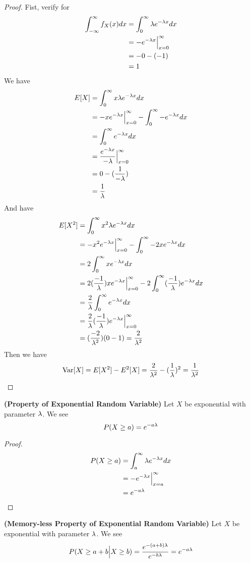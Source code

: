 \documentclass{report}
\begin{document}
\begin{proof}
Fist, verify for
\begin{align}
\int_{-\infty}^\infty f_X(x)dx&=\int_{0}^\infty \lambda e^{-\lambda x}dx\\
                              &=-e^{-\lambda x}\Big|_{x=0}^\infty\\
                              &=-0-(-1)\\
                              &=1
\end{align}
We have
\begin{align}
E[X]&=\int_0^\infty x\lambda e^{-\lambda x}dx\\
&=-xe^{-\lambda x}\Big|_{x=0}^\infty -\int_0^\infty -e^{-\lambda x}dx\\
&=\int_0^\infty e^{-\lambda x}dx\\
&=\frac{e^{-\lambda x}}{-\lambda } \Big|_{x=0}^\infty\\
&=0-(\frac{1}{-\lambda })\\
&=\frac{1}{\lambda }
\end{align}
And have
\begin{align}
E[X^2]&=\int_0^\infty x^2\lambda e^{-\lambda x}dx\\
&=-x^2e^{-\lambda x}\Big|_{x=0}^\infty-\int_0^\infty -2xe^{-\lambda x}dx\\
&=2\int_0^\infty xe^{-\lambda x}dx\\
&=2(\frac{-1}{\lambda })xe^{-\lambda x}\Big|_{x=0}^\infty -2\int_0^\infty (\frac{-1}{\lambda })e^{-\lambda x}dx\\
&=\frac{2}{\lambda }\int_{0}^\infty e^{-\lambda x}dx\\
&=\frac{2}{\lambda }(\frac{-1}{\lambda })e^{-\lambda x}\Big|_{x=0}^\infty\\
&=(\frac{-2}{\lambda ^2})(0-1)=\frac{2}{\lambda ^2}
\end{align}
Then we have
\begin{equation}
\text{Var} [X]=E[X^2]-E^2[X]=\frac{2}{\lambda^2}-(\frac{1}{\lambda })^2=\frac{1}{\lambda ^2}
\end{equation}
\end{proof}
\begin{theorem}
\label{2.1.5}
\textbf{(Property of Exponential Random Variable)} Let $X$ be exponential with parameter  $\lambda $. We see 
\begin{equation}
P(X\geq a )=e^{-a\lambda }
\end{equation}
\end{theorem}
\begin{proof}
\begin{align}
P(X\geq a)&=\int_a^\infty \lambda e^{-\lambda x}dx\\
&=-e^{-\lambda x}\Big|_{x=a}^\infty\\
&=e^{-a\lambda }
\end{align}
\end{proof}
\begin{theorem}
\label{2.1.6}
\textbf{(Memory-less Property of Exponential Random Variable)}  Let $X$ be exponential with parameter $\lambda $. We see
\begin{equation}
P(X\geq  a+b\Big| X\geq  b)=\frac{e^{-(a+b)\lambda }}{e^{-b\lambda }}=e^{-a\lambda }
\end{equation}
\end{theorem}
\end{document}
